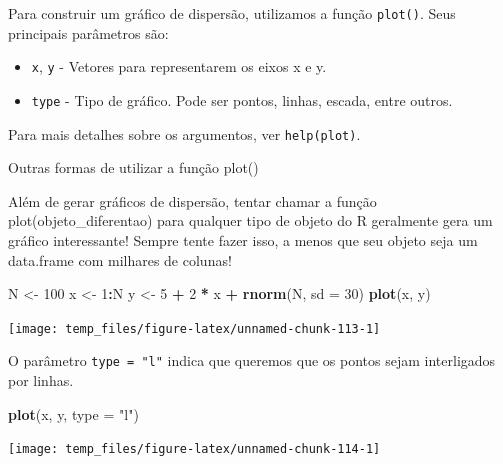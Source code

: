 \documentclass[]{book}
\newenvironment{Shaded}{\begin{snugshade}}{\end{snugshade}}
\newcommand{\DataTypeTok}[1]{\textcolor[rgb]{0.13,0.29,0.53}{#1}}
\newcommand{\DecValTok}[1]{\textcolor[rgb]{0.00,0.00,0.81}{#1}}
\newcommand{\KeywordTok}[1]{\textcolor[rgb]{0.13,0.29,0.53}{\textbf{#1}}}
\newcommand{\NormalTok}[1]{#1}
\newcommand{\OperatorTok}[1]{\textcolor[rgb]{0.81,0.36,0.00}{\textbf{#1}}}
\newcommand{\StringTok}[1]{\textcolor[rgb]{0.31,0.60,0.02}{#1}}
\providecommand{\tightlist}{%
  \setlength{\itemsep}{0pt}\setlength{\parskip}{0pt}}
\begin{document}
Para construir um gráfico de dispersão, utilizamos a função \texttt{plot()}. Seus principais parâmetros são:

\begin{itemize}
\tightlist
\item
  \texttt{x}, \texttt{y} - Vetores para representarem os eixos x e y.
\item
  \texttt{type} - Tipo de gráfico. Pode ser pontos, linhas, escada, entre outros.
\end{itemize}

Para mais detalhes sobre os argumentos, ver \texttt{help(plot)}.

Outras formas de utilizar a função plot()

Além de gerar gráficos de dispersão, tentar chamar a função plot(objeto\_diferentao) para qualquer tipo de objeto do R geralmente gera um gráfico interessante! Sempre tente fazer isso, a menos que seu objeto seja um data.frame com milhares de colunas!

\begin{Shaded}
\begin{Highlighting}[]
\NormalTok{N <-}\StringTok{ }\DecValTok{100}
\NormalTok{x <-}\StringTok{ }\DecValTok{1}\OperatorTok{:}\NormalTok{N}
\NormalTok{y <-}\StringTok{ }\DecValTok{5} \OperatorTok{+}\StringTok{ }\DecValTok{2} \OperatorTok{*}\StringTok{ }\NormalTok{x }\OperatorTok{+}\StringTok{ }\KeywordTok{rnorm}\NormalTok{(N, }\DataTypeTok{sd =} \DecValTok{30}\NormalTok{)}
\KeywordTok{plot}\NormalTok{(x, y)}
\end{Highlighting}
\end{Shaded}

\begin{center}\texttt{[image: temp\_files/figure-latex/unnamed-chunk-113-1]} \end{center}

O parâmetro \texttt{type\ =\ "l"} indica que queremos que os pontos sejam interligados por linhas.

\begin{Shaded}
\begin{Highlighting}[]
\KeywordTok{plot}\NormalTok{(x, y, }\DataTypeTok{type =} \StringTok{"l"}\NormalTok{)}
\end{Highlighting}
\end{Shaded}

\begin{center}\texttt{[image: temp\_files/figure-latex/unnamed-chunk-114-1]} \end{center}
\end{document}
